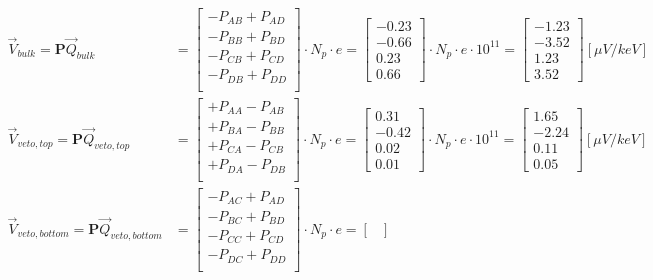 \begin{align}
\label{eq:fid38-sensitivity}
\vec{V}_{bulk} = \bm{P} \vec{Q}_{bulk} &=
\begin{bmatrix}
- P_{AB} + P_{AD} \\
- P_{BB} + P_{BD} \\
- P_{CB} + P_{CD} \\
- P_{DB} + P_{DD} \\
\end{bmatrix}
\cdot N_p \cdot e
= 
\begin{bmatrix}
-0.23 \\ -0.66 \\ 0.23 \\ 0.66
\end{bmatrix}
\cdot N_p \cdot e \cdot 10^{11}
=
\begin{bmatrix}
-1.23 \\ -3.52 \\ 1.23 \\ 3.52
\end{bmatrix}
[\mu V/ keV]
\\
\vec{V}_{veto, top} = \bm{P} \vec{Q}_{veto,top} &=
\begin{bmatrix}
+ P_{AA} - P_{AB} \\
+ P_{BA} - P_{BB} \\
+ P_{CA} - P_{CB} \\
+ P_{DA} - P_{DB} \\
\end{bmatrix}
\cdot N_p \cdot e
= 
\begin{bmatrix}
0.31 \\ -0.42 \\ 0.02 \\ 0.01
\end{bmatrix}
\cdot N_p \cdot e \cdot 10^{11}
= 
\begin{bmatrix}
1.65 \\ -2.24 \\ 0.11 \\ 0.05
\end{bmatrix}
[\mu V/keV]
\\
\vec{V}_{veto,bottom} = \bm{P} \vec{Q}_{veto,bottom} &=
\begin{bmatrix}
- P_{AC} + P_{AD} \\
- P_{BC} + P_{BD} \\
- P_{CC} + P_{CD} \\
- P_{DC} + P_{DD} \\
\end{bmatrix}
\cdot N_p \cdot e
= 
\begin{bmatrix}

\end{bmatrix}
\end{align}
